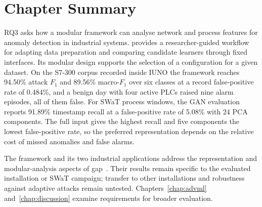 \section{Chapter Summary}
\label{sec:anomaly:summary}

RQ3 asks how a modular framework can analyse network and process features for anomaly
detection in industrial systems. \nadics{} provides a researcher-guided workflow for adapting
data preparation and comparing candidate learners through fixed interfaces. Its modular design
supports the selection of a configuration for a given dataset. On the S7-300 corpus recorded
inside IUNO the framework reaches 94.50\% attack $F_1$ and 89.56\% macro-$F_1$ over six
classes at a record false-positive rate of 0.484\%, and a benign day with four active PLCs raised
nine alarm episodes, all of
them false. For SWaT process windows, the GAN evaluation reports
91.89\% timestamp recall at a false-positive rate of 5.08\% with 24 PCA
components. The full input gives the highest recall and five components the lowest
false-positive rate, so the preferred representation depends on the relative cost of missed
anomalies and false alarms.

The framework and its two industrial applications address the representation and modular-analysis
aspects of gap~. Their results remain specific to the evaluated installation or SWaT
campaign; transfer to other installations and robustness against adaptive attacks remain
untested. Chapters~\ref{chap:advml} and~\ref{chap:discussion} examine requirements for broader
evaluation.
